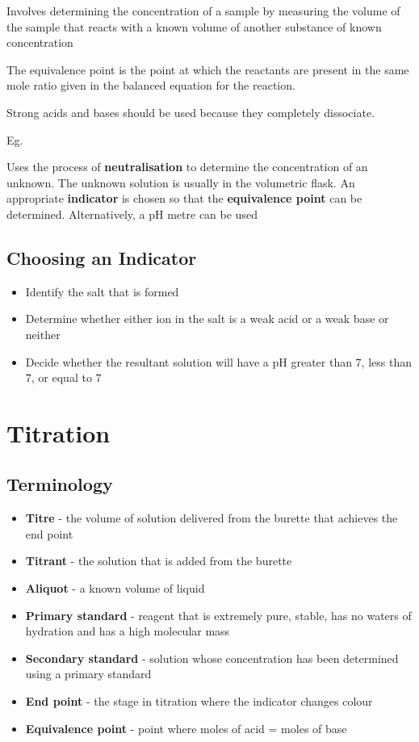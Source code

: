 	Involves determining the concentration of a sample by measuring the volume of the sample that reacts with a known volume of another substance of known concentration

	The equivalence point is the point at which the reactants are present in the same mole ratio given in the balanced equation for the reaction.

	Strong acids and bases should be used because they completely dissociate.

	Eg.

	\begin{center}
	\end{center}

	Uses the process of \textbf{neutralisation} to determine the concentration of an unknown. The unknown solution is usually in the volumetric flask. An appropriate \textbf{indicator} is chosen so that the \textbf{equivalence point} can be determined. Alternatively, a pH metre can be used

	\subsection{Choosing an Indicator}
	
		\begin{itemize}
			\item Identify the salt that is formed
			\item Determine whether either ion in the salt is a weak acid or a weak base or neither
			\item Decide whether the resultant solution will have a pH greater than 7, less than 7, or equal to 7
		\end{itemize}

\section{Titration} \label{10/03/2025}

	\subsection{Terminology}

		\begin{itemize}
			\item \textbf{Titre} - the volume of solution delivered from the burette that achieves the end point
			\item \textbf{Titrant} - the solution that is added from the burette
			\item \textbf{Aliquot} - a known volume of liquid
			\item \textbf{Primary standard} - reagent that is extremely pure, stable, has no waters of hydration and has a high molecular mass
			\item \textbf{Secondary standard} - solution whose concentration has been determined using a primary standard
			\item \textbf{End point} - the stage in titration where the indicator changes colour
			\item \textbf{Equivalence point} - point where moles of acid = moles of base
		\end{itemize}

